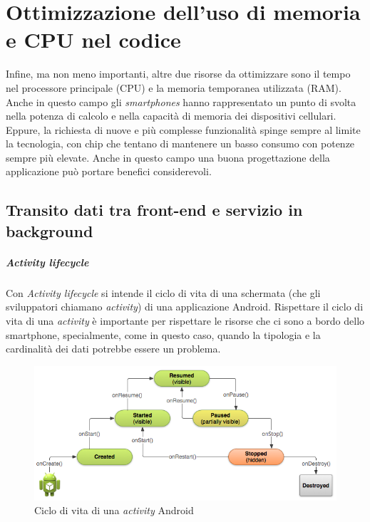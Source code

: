 \documentclass[a4paper,10pt]{memoir}
\begin{document}
\chapter{Ottimizzazione dell'uso di memoria e CPU nel codice}

Infine, ma non meno importanti, altre due risorse da ottimizzare sono il tempo nel processore principale (CPU) e la memoria temporanea utilizzata (RAM). Anche in questo campo gli \textit{smartphones} hanno rappresentato un punto di svolta nella potenza di calcolo e nella capacità di memoria dei dispositivi cellulari. Eppure, la richiesta di nuove e più complesse funzionalità spinge sempre al limite la tecnologia, con chip che tentano di mantenere un basso consumo con potenze sempre più elevate. Anche in questo campo una buona progettazione della applicazione può portare benefici considerevoli.

\section{Transito dati tra front-end e servizio in background}

\paragraph{Activity lifecycle} Con \textit{Activity lifecycle} si intende il ciclo di vita di una schermata (che gli sviluppatori chiamano \textit{activity}) di una applicazione Android. Rispettare il ciclo di vita di una \textit{activity} è importante per rispettare le risorse che ci sono a bordo dello smartphone, specialmente, come in questo caso, quando la tipologia e la cardinalità dei dati potrebbe essere un problema.

\begin{figure}[h]
\centering
\caption{Ciclo di vita di una \textit{activity} Android}
\label{fig:activitylifecycle}
\includegraphics[width=\textwidth]{app/android_activity_lifecycle}
\end{figure}
\end{document}
